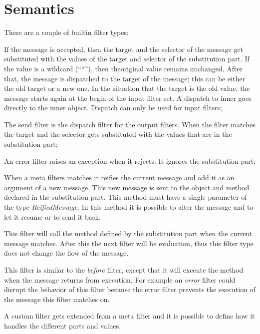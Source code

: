 \section{Semantics}
There are a couple of builtin filter types:
\begin{description}[style=nextline,noitemsep]
\item [Dispatch] If the message is accepted, then the target and the selector of the message get substituted with the values of the target and selector of the substitution part. 
If the value is a wildcard (``*''), then theoriginal value remains unchanged. 
After that, the message is dispatched to the target of the message; this can be either the old target or a new one. 
In the situation that the target is the old value, the message starts again at the begin of the input filter set. 
A dispatch to inner goes directly to the inner object. 
Dispatch can only be used for input filters;
\item [Send] The send filter is the dispatch filter for the output filters. 
When the filter matches the target and the selector gets substituted with the values that are in the substitution part;
\item [Error] An error filter raises an exception when it rejects. 
It ignores the substitution part;
\item [Meta] When a meta filters matches it reifies the current message and add it as an argument of a new message.
This new message is sent to the object and method declared in the
substitution part. This method must have a single parameter of the type \emph{ReifiedMessage}. 
In this method it is possible to alter the message and to let it resume or to send it back.
\item[Before] This filter will call the method defined by the substitution part when the current message matches.
After this the next filter will be evaluation, thus this filter type does not change the flow of the message.
\item[After] This filter is similar to the \emph{before} filter, except that it will execute the method when the message returns from execution.
For example an \emph{error} filter could disrupt the behavior of this filter because the error filter prevents the execution of the message this filter matches on.
\end{description}

A custom filter gets extended from a meta filter and it is possible to define how it handles the different parts
and values.

